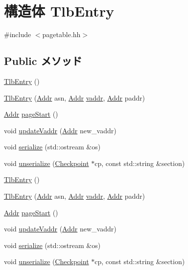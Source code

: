 \hypertarget{structMipsISA_1_1TlbEntry}{
\section{構造体 TlbEntry}
\label{structMipsISA_1_1TlbEntry}
}


{\ttfamily \#include $<$pagetable.hh$>$}\subsection*{Public メソッド}
\begin{DoxyCompactItemize}
\item 
\hyperlink{structMipsISA_1_1TlbEntry_ad069716fb78ffaa2d9bfba679a8eac9a}{TlbEntry} ()
\item 
\hyperlink{structMipsISA_1_1TlbEntry_a69a4824fbe38adbd1517dda05272617d}{TlbEntry} (\hyperlink{classm5_1_1params_1_1Addr}{Addr} asn, \hyperlink{classm5_1_1params_1_1Addr}{Addr} \hyperlink{namespaceMipsISA_ac78d9788b3f9a366df64485c9afaf1b1}{vaddr}, \hyperlink{classm5_1_1params_1_1Addr}{Addr} paddr)
\item 
\hyperlink{classm5_1_1params_1_1Addr}{Addr} \hyperlink{structMipsISA_1_1TlbEntry_a4f87fae41ff4bd27577a41dba3cf2b90}{pageStart} ()
\item 
void \hyperlink{structMipsISA_1_1TlbEntry_a5b72666b92ee0adbe9a7d218a0343754}{updateVaddr} (\hyperlink{classm5_1_1params_1_1Addr}{Addr} new\_\-vaddr)
\item 
void \hyperlink{structMipsISA_1_1TlbEntry_a53e036786d17361be4c7320d39c99b84}{serialize} (std::ostream \&os)
\item 
void \hyperlink{structMipsISA_1_1TlbEntry_af22e5d6d660b97db37003ac61ac4ee49}{unserialize} (\hyperlink{classCheckpoint}{Checkpoint} $\ast$cp, const std::string \&section)
\item 
\hyperlink{structMipsISA_1_1TlbEntry_ad069716fb78ffaa2d9bfba679a8eac9a}{TlbEntry} ()
\item 
\hyperlink{structMipsISA_1_1TlbEntry_a69a4824fbe38adbd1517dda05272617d}{TlbEntry} (\hyperlink{classm5_1_1params_1_1Addr}{Addr} asn, \hyperlink{classm5_1_1params_1_1Addr}{Addr} \hyperlink{namespaceMipsISA_ac78d9788b3f9a366df64485c9afaf1b1}{vaddr}, \hyperlink{classm5_1_1params_1_1Addr}{Addr} paddr)
\item 
\hyperlink{classm5_1_1params_1_1Addr}{Addr} \hyperlink{structMipsISA_1_1TlbEntry_a4f87fae41ff4bd27577a41dba3cf2b90}{pageStart} ()
\item 
void \hyperlink{structMipsISA_1_1TlbEntry_a5b72666b92ee0adbe9a7d218a0343754}{updateVaddr} (\hyperlink{classm5_1_1params_1_1Addr}{Addr} new\_\-vaddr)
\item 
void \hyperlink{structMipsISA_1_1TlbEntry_a53e036786d17361be4c7320d39c99b84}{serialize} (std::ostream \&os)
\item 
void \hyperlink{structMipsISA_1_1TlbEntry_af22e5d6d660b97db37003ac61ac4ee49}{unserialize} (\hyperlink{classCheckpoint}{Checkpoint} $\ast$cp, const std::string \&section)
\end{DoxyCompactItemize}
